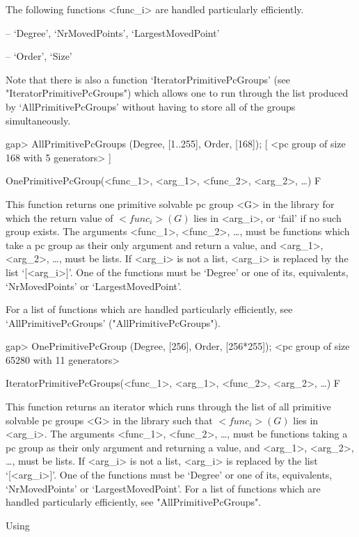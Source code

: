The following functions <func_i> are handled particularly efficiently.

\beginlist
\item{--} `Degree', `NrMovedPoints', `LargestMovedPoint'
\item{--} `Order', `Size'
\endlist

Note that there is also a function `IteratorPrimitivePcGroups' (see
"IteratorPrimitivePcGroups") which allows one to run through the list produced by
`AllPrimitivePcGroups' without having to store all of the groups
simultaneously.

\beginexample
gap> AllPrimitivePcGroups (Degree, [1..255], Order, [168]);
[ <pc group of size 168 with 5 generators> ]
\endexample


\>OnePrimitivePcGroup(<func_1>, <arg_1>, <func_2>, <arg_2>, \dots) F

This function returns one primitive solvable pc
group <G> in the  {\IRREDSOL} library for which the return value of $<func_i>(G)$ lies in
<arg_i>, or `fail' if no such group exists.  The arguments <func_1>, <func_2>, \dots,
must be {\GAP} functions which take a pc group as their only argument and return a
value, and <arg_1>, <arg_2>,
\dots,  must be lists. If <arg_i> is not a list, <arg_i> is replaced by the list
`[<arg_i>]'. One of the functions must be `Degree' or one of its, equivalents, `NrMovedPoints' or `LargestMovedPoint'.

For a list of functions which are handled particularly efficiently, see
`AllPrimitivePcGroups' ("AllPrimitivePcGroups").

\beginexample
gap> OnePrimitivePcGroup (Degree, [256], Order, [256*255]);
<pc group of size 65280 with 11 generators>
\endexample

\>IteratorPrimitivePcGroups(<func_1>, <arg_1>, <func_2>, <arg_2>, \dots) F

This function returns an iterator which runs through the list of all primitive solvable
pc groups <G> in the  {\IRREDSOL} library such that
$<func_i>(G)$ lies in <arg_i>. The arguments <func_1>, <func_2>, \dots,
must be {\GAP} functions taking a pc group as their only argument and returning 
a value, and <arg_1>, <arg_2>, \dots, 
must be lists. If <arg_i> is not a list, <arg_i> is replaced by the list `[<arg_i>]'.
One of the functions must be `Degree' or one of its, equivalents, `NrMovedPoints' 
or `LargestMovedPoint'.
For a list of functions which are handled particularly efficiently, see
"AllPrimitivePcGroups".

Using 

